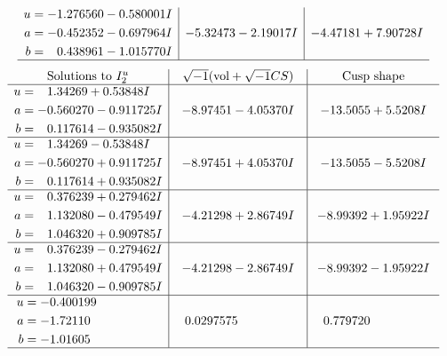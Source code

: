 \documentclass[1p]{elsarticle_modified}
\theoremstyle{definition}
\newcommand{\I}{\sqrt{-1}}
\begin{document}
$$\begin{array}{c|c|c}
\begin{aligned}
u &= -1.276560 - 0.580001 I \\
a &= -0.452352 - 0.697964 I \\
b &= \phantom{-}0.438961 - 1.015770 I\end{aligned}
 & -5.32473 - 2.19017 I & -4.47181 + 7.90728 I\\
 \hline 
 \end{array}$$\newpage$$\begin{array}{c|c|c}  
\text{Solutions to }I^u_{2}& \I (\text{vol} + \sqrt{-1}CS) & \text{Cusp shape}\\
 \hline 
\begin{aligned}
u &= \phantom{-}1.34269 + 0.53848 I \\
a &= -0.560270 - 0.911725 I \\
b &= \phantom{-}0.117614 - 0.935082 I\end{aligned}
 & -8.97451 - 4.05370 I & -13.5055 + 5.5208 I \\ \hline\begin{aligned}
u &= \phantom{-}1.34269 - 0.53848 I \\
a &= -0.560270 + 0.911725 I \\
b &= \phantom{-}0.117614 + 0.935082 I\end{aligned}
 & -8.97451 + 4.05370 I & -13.5055 - 5.5208 I \\ \hline\begin{aligned}
u &= \phantom{-}0.376239 + 0.279462 I \\
a &= \phantom{-}1.132080 - 0.479549 I \\
b &= \phantom{-}1.046320 + 0.909785 I\end{aligned}
 & -4.21298 + 2.86749 I & -8.99392 + 1.95922 I \\ \hline\begin{aligned}
u &= \phantom{-}0.376239 - 0.279462 I \\
a &= \phantom{-}1.132080 + 0.479549 I \\
b &= \phantom{-}1.046320 - 0.909785 I\end{aligned}
 & -4.21298 - 2.86749 I & -8.99392 - 1.95922 I \\ \hline\begin{aligned}
u &= -0.400199\phantom{ +0.000000I} \\
a &= -1.72110\phantom{ +0.000000I} \\
b &= -1.01605\phantom{ +0.000000I}\end{aligned}
 & \phantom{-}0.0297575\phantom{ +0.000000I} & \phantom{-}0.779720\phantom{ +0.000000I}\\
 \hline 
 \end{array}$$\newpage
\end{document}
